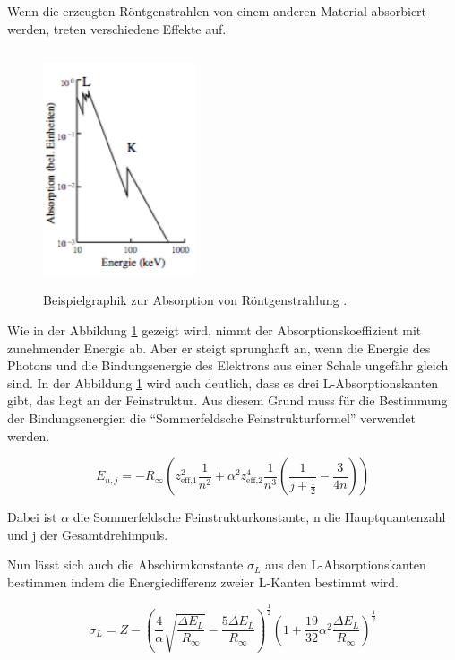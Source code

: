 Wenn die erzeugten Röntgenstrahlen von einem anderen Material absorbiert werden,
treten verschiedene Effekte auf.

\begin{figure}[H]
  \centering
  \includegraphics[width=0.4\textwidth, height=7cm]{content/Absorption.png}
  \caption[width=\linewidth]{Beispielgraphik zur Absorption von Röntgenstrahlung \cite{1}.}
  \label{abb:1}
\end{figure}

Wie in der Abbildung \ref{abb:1} gezeigt wird, nimmt der Absorptionskoeffizient
mit zunehmender Energie ab. Aber er steigt sprunghaft an, wenn die Energie des Photons
und die Bindungsenergie des Elektrons aus einer Schale ungefähr gleich sind.
In der Abbildung \ref{abb:1} wird auch deutlich, dass es drei L-Absorptionskanten
gibt, das liegt an der Feinstruktur. Aus diesem Grund muss für die Bestimmung der
Bindungsenergien die \enquote{Sommerfeldsche Feinstrukturformel} verwendet werden.

\begin{equation}
  E_{n,j} = - R_\infty \left( z_\text{eff,1}^2 \frac{1}{n^2} + \alpha^2
  z_\text{eff,2}^4 \frac{1}{n^3} \left( \frac{1}{j+\frac{1}{2}} - \frac{3}{4n}
  \right)\right)
  \label{eq:3}
\end{equation}

Dabei ist $\alpha$ die Sommerfeldsche Feinstrukturkonstante, n die Hauptquantenzahl
und j der Gesamtdrehimpuls.

Nun lässt sich auch die Abschirmkonstante $\sigma_L$ aus den L-Absorptionskanten
bestimmen indem die Energiedifferenz zweier L-Kanten bestimmt wird.

\begin{equation}
  \sigma_L = Z - \left( \frac{4}{\alpha} \sqrt{\frac{\Delta E_L}{R_\infty}}
  - \frac{5 \Delta E_L}{R_\infty} \right)^{\frac{1}{2}} \left(
  1 + \frac{19}{32} \alpha^2 \frac{\Delta E_L}{R_\infty} \right)^{\frac{1}{2}}
  \label{eq:4}
\end{equation}

